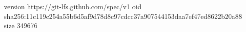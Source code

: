 version https://git-lfs.github.com/spec/v1
oid sha256:11c119c254a55b6d5af9d78d8c97cdcc37a907544153daa7ef47ed8622b20a88
size 349676
